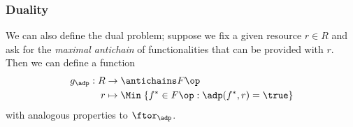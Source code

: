 %
%




\subsubsection{Duality}


We can also define the dual problem; suppose we fix a given resource $r \in R$ and ask for the \emph{maximal antichain} of functionalities that can be provided with $r$. Then we can define a function
\begin{equation}
    \begin{aligned}
        g_\adp : R &\to \antichains F\op \\
        r &\mapsto \Min \; \{ f^* \in F\op : \adp(f^*, r) = \true \}
    \end{aligned}
\end{equation}
with analogous properties to $\ftor_\adp$.

